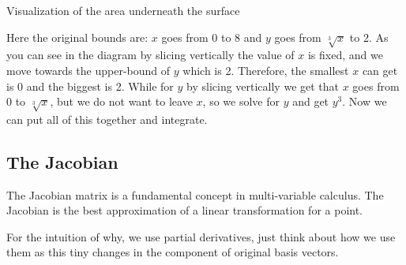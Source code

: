 \begin{center}

    Visualization of the area underneath the surface
    \smallskip

\end{center}

Here the original bounds are: \(x\) goes from 0 to 8 and \(y\) goes from \(\sqrt[3]{x}\) to 2.
As you can see in the diagram by slicing vertically the value of \(x\) is fixed, and we move 
towards the upper-bound of \(y\) which is 2.
Therefore, the smallest \(x\) can get is 0 and the biggest is 2. While for \(y\) by slicing 
vertically we get that \(x\) goes from 0 to \(\sqrt[3]{x}\), but 
we do not want to leave \(x\), so we solve for \(y\) and get \(y^3\). 
Now we can put all of this together and integrate.


\subsection{The Jacobian}

The Jacobian matrix is a fundamental concept in multi-variable calculus. The Jacobian is the best
approximation of a linear transformation for a point.

For the intuition of why, we use partial derivatives, just think about
how we use them as this tiny changes in the component of original
basis vectors.

